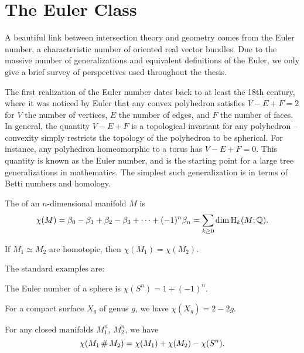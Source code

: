 \pagebreak
\section{The Euler Class}\label{sec:euler-class}

A beautiful link between intersection theory and geometry comes from the Euler number, a characteristic number of oriented real vector bundles. Due to the massive number of generalizations and equivalent definitions of the Euler, we only give a brief survey of perspectives used throughout the thesis.

The first realization of the Euler number dates back to at least the 18th century, where it was noticed by Euler that any convex polyhedron satisfies $V-E+F=2$ for $V$ the number of vertices, $E$ the number of edges, and $F$ the number of faces. 
In general, the quantity $V-E+F$ is a topological invariant for any polyhedron -- convexity simply restricts the topology of the polyhedron to be spherical.
For instance, any polyhedron homeomorphic to a torus has $V-E+F=0$. 
This quantity is known as the Euler number, and is the starting point for a large tree generalizations in mathematics. 
The simplest such generalization is in terms of Betti numbers and homology.

\begin{definition}
  The  of an $n$-dimensional manifold $M$ is
  \[
    \chi(M) = \beta_0 - \beta_1 + \beta_2 - \beta_3 + \cdots + (-1)^n\beta_n = \sum_{k\geq 0} \dim \operatorname{H}_k(M; \mathbb{Q}).
  \]
\end{definition}

\begin{proposition}
  If $M_1\simeq M_2$ are homotopic, then $\chi(M_1)=\chi(M_2)$.
\end{proposition}

The standard examples are:

\begin{example}
  The Euler number of a sphere is $\chi(S^n)=1+(-1)^n$.
\end{example}

\begin{example}
  For a compact surface $X_g$ of genus $g$, we have $\chi(X_g)=2-2g$.
\end{example}

\begin{proposition}
  For any closed manifolds $M_1^n$, $M_2^n$, we have 
  \[\chi(M_1\+M_2)=\chi(M_1)+\chi(M_2)-\chi(S^n).\]
\end{proposition}

